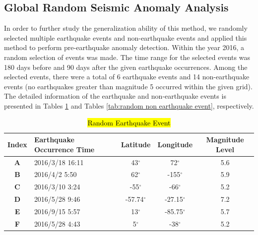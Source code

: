 \documentclass[3p,authoryear,preprint,12pt]{elsarticle}
\begin{document}
\subsection{Global Random Seismic Anomaly Analysis}
{In order to further study the generalization ability of this method, we randomly selected multiple earthquake events and non-earthquake events and applied this method to perform pre-earthquake anomaly detection.} {Within the year 2016, a random selection of events was made.} The time range for the selected events was 180 days before and 90 days after the given earthquake occurrences. Among the selected events, there were a total of 6 earthquake events and 14 non-earthquake events (no earthquakes greater than magnitude 5 occurred within the given grid). The detailed information of the earthquake and non-earthquake events is presented in Tables \ref{tab:random earthquake event} and Tables \ref{tab:random non earthquake event}, respectively.
\begin{table}[htbp]
	\caption{\hl{Random Earthquake Event}}
	\label{tab:random earthquake event}
	\centering
	\begin{tabular}{clccc}
		\toprule
		\textbf{Index} & \textbf{Earthquake Occurrence Time} &\textbf{Latitude}&\textbf{Longitude}&\textbf{Magnitude Level} \\
		\midrule
		\textbf{A}&2016/3/18 16:11 & 43$^\circ$     & 72$^\circ$     & 5.6  \\
		\textbf{B}&2016/4/2 5:50   & 62$^\circ$     & -155$^\circ$   & 5.9  \\
		\textbf{C}&2016/3/10 3:24  & -55$^\circ$    & -66$^\circ$    & 5.2  \\
		\textbf{D}&2016/5/28 9:46  & -57.74$^\circ$ & -27.15$^\circ$ & 7.2 \\
		\textbf{E}&2016/9/15 5:57  & 13$^\circ$     & -85.75$^\circ$ & 5.7 \\
		\textbf{F}&2016/5/28 4:43  & 5$^\circ$      & -38$^\circ$    & 5.2 \\
		\bottomrule
	\end{tabular}
\end{table}
\end{document}
